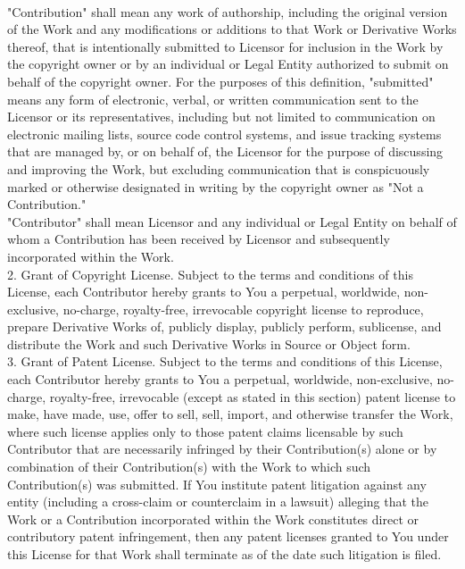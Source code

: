 {\\[4pt]
"Contribution" shall mean any work of authorship, including the
original version of the Work and any modifications or additions to
that Work or Derivative Works thereof, that is intentionally submitted
to Licensor for inclusion in the Work by the copyright owner or by an
individual or Legal Entity authorized to submit on behalf of the
copyright owner. For the purposes of this definition, "submitted"
means any form of electronic, verbal, or written communication sent to
the Licensor or its representatives, including but not limited to
communication on electronic mailing lists, source code control
systems, and issue tracking systems that are managed by, or on behalf
of, the Licensor for the purpose of discussing and improving the Work,
but excluding communication that is conspicuously marked or otherwise
designated in writing by the copyright owner as "Not a Contribution."
\\[4pt]
"Contributor" shall mean Licensor and any individual or Legal Entity
on behalf of whom a Contribution has been received by Licensor and
subsequently incorporated within the Work.
\\[4pt]
2. Grant of Copyright License. Subject to the terms and conditions of
this License, each Contributor hereby grants to You a perpetual,
worldwide, non-exclusive, no-charge, royalty-free, irrevocable
copyright license to reproduce, prepare Derivative Works of, publicly
display, publicly perform, sublicense, and distribute the Work and
such Derivative Works in Source or Object form.
\\[4pt]
3. Grant of Patent License. Subject to the terms and conditions of
this License, each Contributor hereby grants to You a perpetual,
worldwide, non-exclusive, no-charge, royalty-free, irrevocable (except
as stated in this section) patent license to make, have made, use,
offer to sell, sell, import, and otherwise transfer the Work, where
such license applies only to those patent claims licensable by such
Contributor that are necessarily infringed by their Contribution(s)
alone or by combination of their Contribution(s) with the Work to
which such Contribution(s) was submitted. If You institute patent
litigation against any entity (including a cross-claim or counterclaim
in a lawsuit) alleging that the Work or a Contribution incorporated
within the Work constitutes direct or contributory patent
infringement, then any patent licenses granted to You under this
License for that Work shall terminate as of the date such litigation
is filed.
\\[4pt]
}
